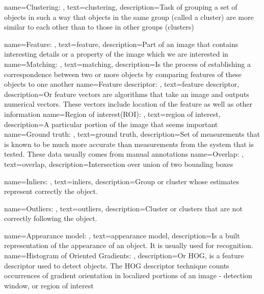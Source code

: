 {
  name=Clustering: ,
  text=clustering,  
  description={Task of grouping a set of objects in such a way that objects in
  				the same group (called a cluster) are more similar to each other
  				than to those in other groups (clusters)}
}

{
  name=Feature: ,
  text=feature,  
  description={Part of an image that contains interesting details or a property
  			  of the image which we are interested in}
}
{
  name=Matching: ,
  text=matching,  
  description={Is the process of establishing a correspondence between two
			   or more objects by comparing features of these objects to one
			   another}
}
{
  name=Feature descriptor: ,
  text=feature descriptor,  
  description={Or feature vectors are algorithms that take an image and outputs
  				numerical vectors. These vectors include location of the feature
  				as well as other information}
}
{
  name=Region of interest(ROI): ,
  text=region of interest,  
  description={A particular portion of the image that seems important}
}
{
  name=Ground truth: ,
  text=ground truth,  
  description={Set of measurements that is known to be much more accurate than
  			measurements from the system that is tested. These data usually
  			comes from manual annotations}
}
{
  name=Overlap: ,
  text=overlap,  
  description={Intersection over union of two bounding boxes}
}

{
  name=Inliers: ,
  text=inliers,  
  description={Group or cluster whose estimates represent 
  				correctly the object.}
}

{
  name=Outliers: ,
  text=outliers,  
  description={Cluster or clusters that are not correctly following the object.}
}

{
  name=Appearance model: ,
  text=appearance model,  
  description={Is a built representation of the appearance of an object. It is
  				usually used for recognition.}
}
{
  name=Histogram of Oriented Gradients: ,
  description={Or HOG, is a feature descriptor used to detect objects. The HOG
  			   descriptor technique counts occurrences of gradient orientation
  			   in localized portions of an image - detection window, or region
  			   of interest}
}



